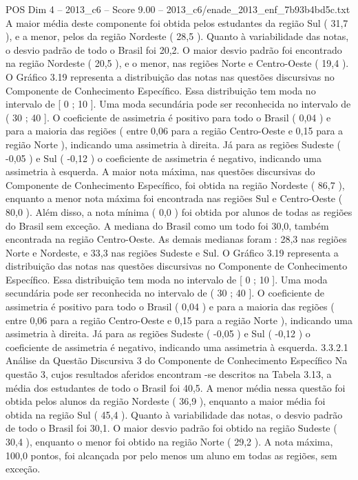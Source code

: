 \begin{textsample}{POS Dim 4 – 2013\_c6 – Score 9.00 – 2013\_c6/enade\_2013\_enf\_7b93b4bd5c.txt}
A maior média deste componente foi obtida pelos estudantes da região Sul ( 31,7 ), e a menor, pelos da região Nordeste ( 28,5 ).
Quanto à variabilidade das notas, o desvio padrão de todo o Brasil foi 20,2.
O maior desvio padrão foi encontrado na região Nordeste ( 20,5 ), e o menor, nas regiões Norte e Centro-Oeste ( 19,4 ).
O Gráfico 3.19 representa a distribuição das notas nas questões discursivas no Componente de Conhecimento Específico.
Essa distribuição tem moda no intervalo de [ 0 ; 10 ].
Uma moda secundária pode ser reconhecida no intervalo de ( 30 ; 40 ].
O coeficiente de assimetria é positivo para todo o Brasil ( 0,04 ) e para a maioria das regiões ( entre 0,06 para a região Centro-Oeste e 0,15 para a região Norte ), indicando uma assimetria à direita.
Já para as regiões Sudeste ( -0,05 ) e Sul ( -0,12 ) o coeficiente de assimetria é negativo, indicando uma assimetria à esquerda.
A maior nota máxima, nas questões discursivas do Componente de Conhecimento Específico, foi obtida na região Nordeste ( 86,7 ), enquanto a menor nota máxima foi encontrada nas regiões Sul e Centro-Oeste ( 80,0 ).
Além disso, a nota mínima ( 0,0 ) foi obtida por alunos de todas as regiões do Brasil sem exceção.
A mediana do Brasil como um todo foi 30,0, também encontrada na região Centro-Oeste.
As demais medianas foram : 28,3 nas regiões Norte e Nordeste, e 33,3 nas regiões Sudeste e Sul.
O Gráfico 3.19 representa a distribuição das notas nas questões discursivas no Componente de Conhecimento Específico.
Essa distribuição tem moda no intervalo de [ 0 ; 10 ].
Uma moda secundária pode ser reconhecida no intervalo de ( 30 ; 40 ].
O coeficiente de assimetria é positivo para todo o Brasil ( 0,04 ) e para a maioria das regiões ( entre 0,06 para a região Centro-Oeste e 0,15 para a região Norte ), indicando uma assimetria à direita.
Já para as regiões Sudeste ( -0,05 ) e Sul ( -0,12 ) o coeficiente de assimetria é negativo, indicando uma assimetria à esquerda. 3.3.2.1 Análise da Questão Discursiva 3 do Componente de Conhecimento Específico Na questão 3, cujos resultados aferidos encontram -se descritos na Tabela 3.13, a média dos estudantes de todo o Brasil foi 40,5.
A menor média nessa questão foi obtida pelos alunos da região Nordeste ( 36,9 ), enquanto a maior média foi obtida na região Sul ( 45,4 ).
Quanto à variabilidade das notas, o desvio padrão de todo o Brasil foi 30,1.
O maior desvio padrão foi obtido na região Sudeste ( 30,4 ), enquanto o menor foi obtido na região Norte ( 29,2 ).
A nota máxima, 100,0 pontos, foi alcançada por pelo menos um aluno em todas as regiões, sem exceção.

\end{textsample}
